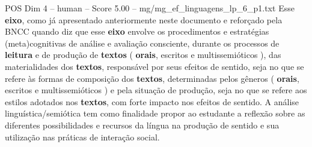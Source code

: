\begin{textsample}{POS Dim 4 – human – Score 5.00 – mg/mg\_ef\_linguagens\_lp\_6\_p1.txt}  \label{ex:f4_pos_008}
Esse \textbf{eixo}, como já apresentado anteriormente neste documento e reforçado pela BNCC quando diz que esse \textbf{eixo} envolve os procedimentos e estratégias (meta)cognitivas de análise e avaliação consciente, durante os processos de \textbf{leitura} e de produção de \textbf{textos} ( \textbf{orais}, escritos e multissemióticos ), das materialidades dos \textbf{textos}, responsável por seus efeitos de sentido, seja no que se refere às formas de composição dos \textbf{textos}, determinadas pelos gêneros ( \textbf{orais}, escritos e multissemióticos ) e pela situação de produção, seja no que se refere aos estilos adotados nos \textbf{textos}, com forte impacto nos efeitos de sentido.
A análise linguística/semiótica tem como finalidade propor ao estudante a reflexão sobre as diferentes possibilidades e recursos da língua na produção de sentido e sua utilização nas práticas de interação social.

\end{textsample}
